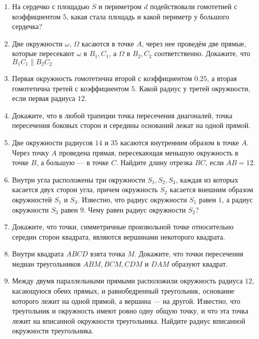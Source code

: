 \documentclass{article}
\begin{document}
\begin{enumerate}[label*=\protect\fbox{\arabic{enumi}}]
	
\item На сердечко с площадью $S$ и периметром $d$ подействовали гомотетией с коэффициентом $5$, какая стала площадь и какой периметр у большого сердечка?
	
\item Две окружности $\omega$, $\Omega$ касаются в точке $A$, через нее проведём две прямые, которые пересекают $\omega$ в $B_1, C_1$, а $\Omega$ в $B_2, C_2$ соответственно. Докажите, что $B_1C_1 \parallel B_2C_2$

\item Первая окружность гомотетична второй с коэффициентом $0.25$, а вторая гомотетична третей с коэффициентом $5$. Какой радиус у третей окружности, если первая радиуса $12$.

\item Докажите, что в любой трапеции точка пересечения диагоналей, точка пересечения боковых сторон и середины оснований лежат на одной прямой.
	
\item Две окружности радиусов $14$ и $35$ касаются внутренним образом в точке $A$. Через точку $A$ проведена прямая, пересекающая меньшую окружность в точке $B$, а большую — в точке $C$. Найдите длину отрезка $BC$, если $AB=12$.

\item Внутри угла расположены три окружности $S_1, S_2, S_3$, каждая из которых касается двух сторон угла, причем окружность $S_2$ касается внешним образом окружностей $S_1$ и $S_3$. Известно, что радиус окружности $S_1$ равен $1$, а радиус окружности $S_3$ равен $9$. Чему равен радиус окружности $S_2$?

\item Докажите, что точки, симметричные произвольной точке относительно середин сторон квадрата, являются вершинами некоторого квадрата.

\item Внутри квадрата $ABCD$ взята точка $M$. Докажите, что точки пересечения медиан треугольников  $ABM, BCM, CDM$ и $DAM$ образуют квадрат.

\item Между двумя параллельными прямыми расположили окружность радиуса $12$, касающуюся обеих прямых, и равнобедренный треугольник, основание которого лежит на одной прямой, а вершина — на другой. Известно, что треугольник и окружность имеют ровно одну общую точку, и что эта точка лежит на вписанной окружности треугольника. Найдите радиус вписанной окружности треугольника.


\end{enumerate}
\end{document}
